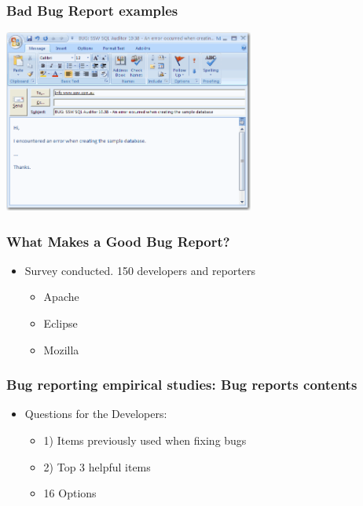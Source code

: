 \documentclass{beamer}
\begin{document}

\begin{frame}
 \frametitle{Bad Bug Report examples}
\begin{center}
 \includegraphics[height=6cm]{figs/BadBugEmail.png}
\begin{figure}
\end{figure}
\end{center}
\end{frame}


\begin{frame}
 \frametitle{What Makes a Good Bug Report?}
 \begin{itemize}
    \item Survey conducted. 150 developers and reporters
        \begin{itemize}
        \item Apache
        \item Eclipse
        \item Mozilla
        \end{itemize}
 \end{itemize}
\end{frame}


\begin{frame}
 \frametitle{Bug reporting empirical studies: Bug reports contents}
 \begin{itemize}
    \item Questions for the Developers:
      \begin{itemize}
      \item 1) Items previously used when fixing bugs
      \item 2) Top 3 helpful items 
      \item 16 Options
      \end{itemize}
 \end{itemize}
\end{frame}
\end{document}
